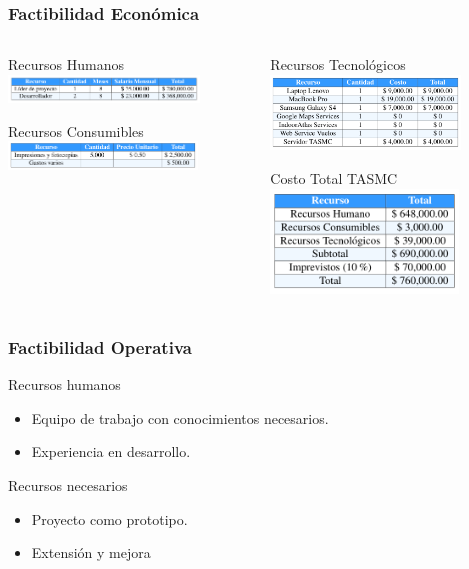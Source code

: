 \documentclass[12pt]{beamer}
\begin{document}
\begin{frame}
	\frametitle{Factibilidad Económica}
	\begin{columns} 
		\begin{column}{5cm}
			\begin{block}{Recursos Humanos}
				\includegraphics[height=0.75cm]{imagenes/rh.png}
			\end{block}
			\begin{block}{Recursos Consumibles}
				\includegraphics[height=0.76cm]{imagenes/rc.png}
			\end{block}
		\end{column}
		\begin{column}{5cm} 
			\begin{block}{Recursos Tecnológicos}
				\includegraphics[height=2cm]{imagenes/rt.png}
			\end{block}
			\begin{block}{Costo Total TASMC}
				\includegraphics[height=2.8cm]{imagenes/ct.png}
			\end{block}
		\end{column} 
	\end{columns}
\end{frame}


\begin{frame}
		\frametitle{Factibilidad Operativa}
		\begin{block}{Recursos humanos}
			\begin{itemize}
			\item Equipo de trabajo con conocimientos necesarios.
			\item Experiencia en desarrollo.
			\end{itemize}
		\end{block}
		\begin{block}{Recursos necesarios}
			\begin{itemize}
			\item Proyecto como prototipo.
			\item Extensión y mejora
			\end{itemize}
		\end{block}
\end{frame}
\end{document}
